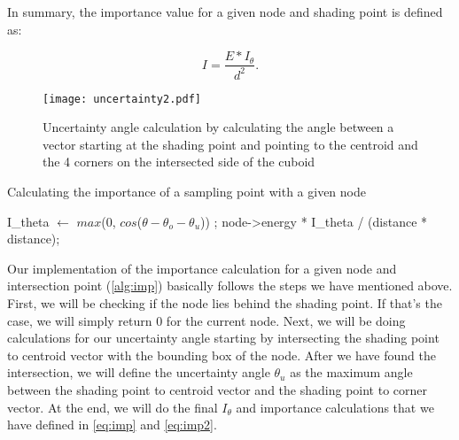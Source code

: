 In summary, the importance value for a given node and shading point is defined as:

\begin{equation}
\label{eq:imp2}
I = \frac{E * I_\theta}{d ^ 2}.
\end{equation}

\begin{figure}
	\begin{center}
		\texttt{[image: uncertainty2.pdf]}
		\caption{Uncertainty angle calculation by calculating the angle between a vector starting at the shading point and pointing to the centroid and the 4 corners on the intersected side of the cuboid}
		\label{fig:uncertainty2}
	\end{center}
\end{figure}


\begin{algorithm}
	\caption{Calculating the importance of a sampling point with a given node}
	\label{alg:imp}
	\begin{algorithmic}[1] %
		\State I\_theta $\gets$ $max$(0, $cos$($\theta - \theta_o - \theta_u$))
		\Else
		\State {};
		\EndIf
		\State \Return node->energy * I\_theta / (distance * distance);
		\EndProcedure
	\end{algorithmic}
\end{algorithm}

Our implementation of the importance calculation for a given node and intersection point (\ref{alg:imp}) basically follows the steps we have mentioned above. First, we will be checking if the node lies behind the shading point. If that's the case, we will simply return 0 for the current node. Next, we will be doing calculations for our uncertainty angle starting by intersecting the shading point to centroid vector with the bounding box of the node. After we have found the intersection, we will define the uncertainty angle $\theta_u$ as the maximum angle between the shading point to centroid vector and the shading point to corner vector. At the end, we will do the final $I_\theta$ and importance calculations that we have defined in \ref{eq:imp} and  \ref{eq:imp2}.

